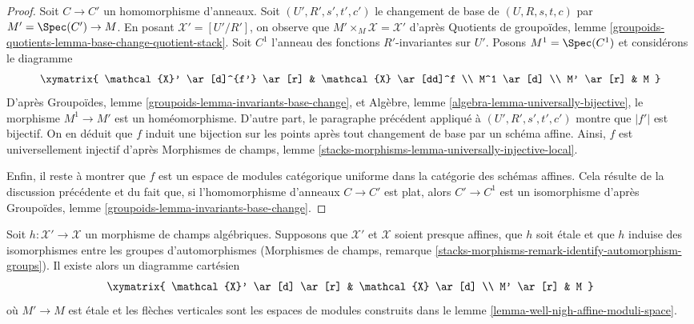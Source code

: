 \begin{proof}
\medskip\noindent
Soit $C \to C'$ un homomorphisme d'anneaux. Soit $(U', R', s', t', c')$
le changement de base de $(U, R, s, t, c)$ par $M' = \Spec(C') \to M$.
En posant $\mathcal{X}' = [U'/R']$, on observe que
$M' \times_M \mathcal{X} = \mathcal{X}'$ d'après
Quotients de groupoïdes, lemme
\ref{groupoids-quotients-lemma-base-change-quotient-stack}.
Soit $C^1$ l'anneau des fonctions $R'$-invariantes sur $U'$.
Posons $M^1 = \Spec(C^1)$ et considérons le diagramme
$$
\xymatrix{
\mathcal{X}' \ar[d]^{f'} \ar[r] & \mathcal{X} \ar[dd]^f \\
M^1 \ar[d] \\
M' \ar[r] & M
}
$$
D'après Groupoïdes, lemme \ref{groupoids-lemma-invariants-base-change}, et
Algèbre, lemme \ref{algebra-lemma-universally-bijective},
le morphisme $M^1 \to M'$ est un homéomorphisme.
D'autre part, le paragraphe précédent appliqué à
$(U', R', s', t', c')$ montre que $|f'|$ est bijectif.
On en déduit que $f$ induit une bijection sur les points après tout
changement de base par un schéma affine. Ainsi, $f$ est universellement injectif
d'après Morphismes de champs, lemme
\ref{stacks-morphisms-lemma-universally-injective-local}.

\medskip\noindent
Enfin, il reste à montrer que $f$ est un espace de modules catégorique uniforme
dans la catégorie des schémas affines. Cela résulte de la discussion
précédente et du fait que, si
l'homomorphisme d'anneaux $C \to C'$ est plat, alors $C' \to C^1$ est un isomorphisme
d'après Groupoïdes, lemme \ref{groupoids-lemma-invariants-base-change}.
\end{proof}

\begin{lemma}
\label{lemma-well-nigh-affine-moduli-space-etale}
Soit $h : \mathcal{X}' \to \mathcal{X}$ un morphisme de champs algébriques.
Supposons que $\mathcal{X}'$ et $\mathcal{X}$ soient presque affines,
que $h$ soit \'etale et que $h$ induise des isomorphismes entre les groupes d'automorphismes
(Morphismes de champs, remarque
\ref{stacks-morphisms-remark-identify-automorphism-groups}).
Il existe alors un diagramme cartésien
$$
\xymatrix{
\mathcal{X}' \ar[d] \ar[r] & \mathcal{X} \ar[d] \\
M' \ar[r] & M
}
$$
où $M' \to M$ est \'etale et
les flèches verticales sont les espaces de modules construits dans le
lemme \ref{lemma-well-nigh-affine-moduli-space}.
\end{lemma}

